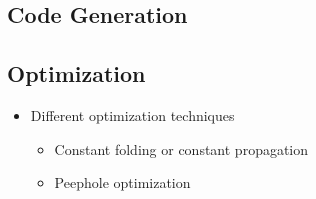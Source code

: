 \subsection{Code Generation}

\subsection{Optimization}
\label{sec:background_compiler_codeOptimization}
\begin{itemize}
    \item Different optimization techniques
    \begin{itemize}
        \item Constant folding or constant propagation
        \item Peephole optimization
    \end{itemize}
\end{itemize}